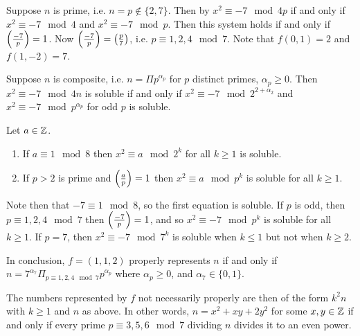 \documentclass[10pt,a4paper]{article}
\begin{document}
Suppose $n$ is prime, i.e. $n=p \notin \{2,7\}$. Then by $x^2 \equiv -7 \mod 4p$ if and only if $x^2 \equiv -7 \mod 4$ and $x^2 \equiv -7 \mod p$. Then this system holds if and only if $\left(\frac{-7}{p}\right) = 1$. Now $\left(\frac{-7}{p}\right) = \left(\frac{p}{7}\right)$, i.e. $p \equiv 1, 2, 4 \mod 7$. Note that $f(0,1) = 2$ and $f(1,-2) = 7$.

Suppose $n$ is composite, i.e. $n = \Pi p^{\alpha_p}$ for $p$ distinct primes, $\alpha_p \geq 0$. Then $x^2 \equiv -7 \mod 4n$ is soluble if and only if $x^2 \equiv -7 \mod 2^{2+\alpha_2}$ and $x^2 \equiv -7 \mod p^{\alpha_p}$ for odd $p$ is soluble.

\begin{lemma}
Let $a \in \mathbb{Z}$.
\begin{enumerate}
\item If $a \equiv 1 \mod 8$ then $x^2 \equiv a \mod 2^k$ for all $k \geq 1$ is soluble.
\item If $p > 2$ is prime and $\left(\frac{a}{p}\right) = 1$ then $x^2 \equiv a \mod p^k$ is soluble for all $k \geq 1$.
\end{enumerate}
\end{lemma}

Note then that $-7 \equiv 1 \mod 8$, so the first equation is soluble. If $p$ is odd, then $p \equiv 1, 2, 4\mod 7$ then $\left(\frac{-7}{p}\right) = 1$, and so $x^2 \equiv -7 \mod p^k$ is soluble for all $k\geq 1$. If $p = 7$, then $x^2 \equiv -7 \mod 7^k$ is soluble when $k \leq 1$ but not when $k \geq 2$.

In conclusion, $f = (1,1,2)$ properly represents $n$ if and only if $n = 7^{\alpha_7} \Pi_{p \equiv 1,2,4 \mod 7} p^{\alpha_p}$ where $\alpha_p \geq 0$, and $\alpha_7 \in \{0,1\}$.

The numbers represented by $f$ not necessarily properly are then of the form $k^2 n$ with $k\geq 1$ and $n$ as above. In other words, $n = x^2 + xy + 2y^2$ for some $x,y \in \mathbb{Z}$ if and only if every prime $p \equiv 3,5,6 \mod 7$ dividing $n$ divides it to an even power.
\end{document}
